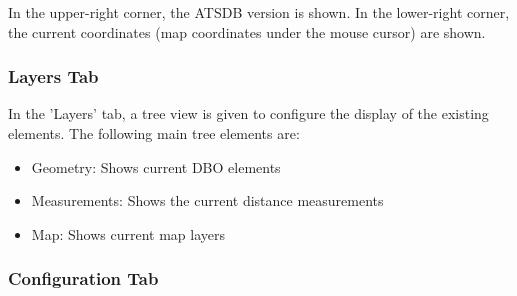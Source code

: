 In the upper-right corner, the ATSDB version is shown. In the lower-right corner, the current coordinates (map coordinates under the mouse cursor) are shown.

\subsubsection{Layers Tab}

In the 'Layers' tab, a tree view is given to configure the display of the existing elements. The following main tree elements are:
\begin{itemize}
 \item Geometry: Shows current DBO elements
 \item Measurements: Shows the current distance measurements
 \item Map: Shows current map layers
\end{itemize}

\subsubsection{Configuration Tab}
\label{sec:osgview_config}

